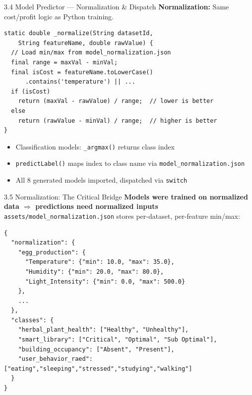 \documentclass[aspectratio=169]{beamer}
\begin{document}
\begin{frame}{3.4 Model Predictor --- Normalization \& Dispatch}
  \textbf{Normalization:} Same cost/profit logic as Python training.

  \vspace{0.1cm}
  \begin{lstlisting}[style=dartstyle,basicstyle=\ttfamily\footnotesize]
static double _normalize(String datasetId,
    String featureName, double rawValue) {
  // Load min/max from model_normalization.json
  final range = maxVal - minVal;
  final isCost = featureName.toLowerCase()
      .contains('temperature') || ...
  if (isCost)
    return (maxVal - rawValue) / range;  // lower is better
  else
    return (rawValue - minVal) / range;  // higher is better
}
  \end{lstlisting}

  \vspace{0.1cm}
  \begin{itemize}
    \item Classification models: \texttt{\_argmax()} returns class index
    \item \texttt{predictLabel()} maps index to class name via \texttt{model\_normalization.json}
    \item All 8 generated models imported, dispatched via \texttt{switch}
  \end{itemize}
\end{frame}

\begin{frame}{3.5 Normalization: The Critical Bridge}
  \textbf{Models were trained on normalized data $\Rightarrow$ predictions need normalized inputs}
  \texttt{assets/model\_normalization.json} stores per-dataset, per-feature min/max:

  \vspace{0.1cm}
  \begin{lstlisting}[style=jsonstyle,basicstyle=\ttfamily\footnotesize]
{
  "normalization": {
    "egg_production": {
      "Temperature": {"min": 10.0, "max": 35.0},
      "Humidity": {"min": 20.0, "max": 80.0},
      "Light_Intensity": {"min": 0.0, "max": 500.0}
    },
    ...
  },
  "classes": {
    "herbal_plant_health": ["Healthy", "Unhealthy"],
    "smart_library": ["Critical", "Optimal", "Sub Optimal"],
    "building_occupancy": ["Absent", "Present"],
    "user_behavior_raed": ["eating","sleeping","stressed","studying","walking"]
  }
}
  \end{lstlisting}
\end{frame}
\end{document}
